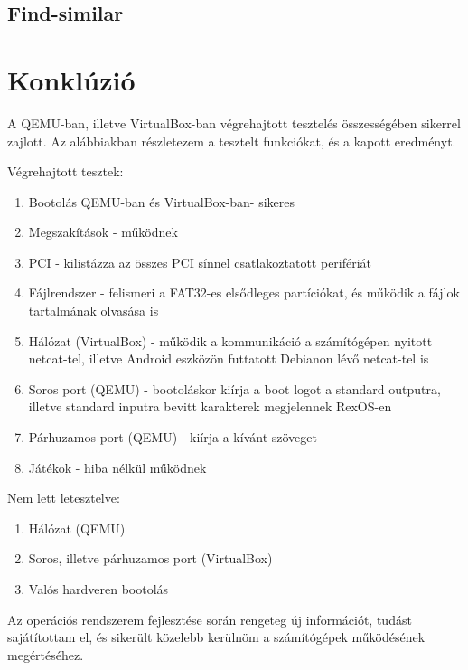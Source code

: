 \documentclass[12pt,numbers=noenddot]{report}
\begin{document}
\section{Find-similar}



\chapter{Konklúzió}

A QEMU-ban, illetve VirtualBox-ban végrehajtott tesztelés összességében sikerrel
zajlott. Az alábbiakban részletezem a tesztelt funkciókat, és a kapott
eredményt.

\hfill \break
Végrehajtott tesztek:

\begin{enumerate}
	\item Bootolás QEMU-ban és VirtualBox-ban- sikeres
	\item Megszakítások - működnek
	\item PCI - kilistázza az összes PCI sínnel csatlakoztatott perifériát
	\item Fájlrendszer - felismeri a FAT32-es elsődleges partíciókat, és
	működik a fájlok tartalmának olvasása is
	\item Hálózat (VirtualBox) - működik a kommunikáció a számítógépen nyitott
	netcat-tel, illetve Android eszközön futtatott Debianon lévő netcat-tel is
	\item Soros port (QEMU) - bootoláskor kiírja a boot logot a standard
	outputra, illetve standard inputra bevitt karakterek megjelennek RexOS-en
	\item Párhuzamos port (QEMU) - kiírja a kívánt szöveget
	\item Játékok - hiba nélkül működnek
\end{enumerate}

\noindent Nem lett letesztelve:

\begin{enumerate}
	\item Hálózat (QEMU)
	\item Soros, illetve párhuzamos port (VirtualBox)
	\item Valós hardveren bootolás
\end{enumerate}

\noindent Az operációs rendszerem fejlesztése során rengeteg új információt,
tudást sajátítottam el, és sikerült közelebb kerülnöm a számítógépek működésének
megértéséhez.
\end{document}
